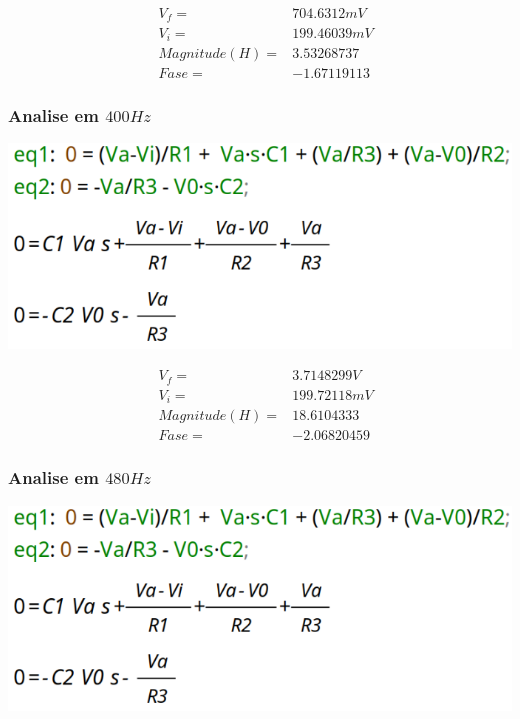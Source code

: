 \documentclass[12pt,twoside, a4paper, twocolumn]{article}
\begin{document}
\begin{equation*}
    \begin{aligned}
         & V_f =          & 704.6312mV  \\
         & V_i =          & 199.46039mV \\
         & Magnitude(H) = & 3.53268737  \\
         & Fase =         & -1.67119113
    \end{aligned}
\end{equation*}


\subsubsection{Analise em $400Hz$}


\begin{adjustbox}{scale=0.09}
    \includegraphics{eqs.png}
\end{adjustbox}


\begin{equation*}
    \begin{aligned}
         & V_f =          & 3.7148299V  \\
         & V_i =          & 199.72118mV \\
         & Magnitude(H) = & 18.6104333  \\
         & Fase =         & -2.06820459
    \end{aligned}
\end{equation*}


\subsubsection{Analise em $480Hz$}


\begin{adjustbox}{scale=0.09}
    \includegraphics{eqs.png}
\end{adjustbox}
\end{document}
